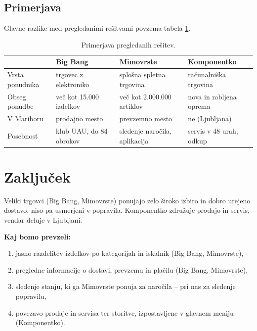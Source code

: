 \documentclass[11pt,a4paper]{article}
\begin{document}
\subsection{Primerjava}

Glavne razlike med pregledanimi rešitvami povzema tabela \ref{tabela1}.

\begin{table}[h]
\centering
\begin{tabular}{|l|>{\raggedright\arraybackslash}p{3.5cm}|>{\raggedright\arraybackslash}p{3.5cm}|>{\raggedright\arraybackslash}p{3.5cm}|}
\hline
 & \textbf{Big Bang} & \textbf{Mimovrste} & \textbf{Komponentko} \\
\hline
Vrsta ponudnika & trgovec z elektroniko & splošna spletna trgovina & računalniška trgovina \\
\hline
Obseg ponudbe & več kot 15.000 izdelkov & več kot 2.000.000 artiklov & nova in rabljena oprema \\
\hline
V Mariboru & prodajno mesto & prevzemno mesto & ne (Ljubljana) \\
\hline
Posebnost & klub UAU, do 84 obrokov & sledenje naročila, aplikacija & servis v 48 urah, odkup \\
\hline
\end{tabular}
\caption{Primerjava pregledanih rešitev.}
\label{tabela1}
\end{table}

\section{Zaključek}
\label{zakljucek}

Veliki trgovci (Big Bang, Mimovrste) ponujajo zelo široko izbiro in dobro urejeno
dostavo, niso pa usmerjeni v popravila. Komponentko združuje prodajo in servis,
vendar deluje v Ljubljani.

\textbf{Kaj bomo prevzeli:}
\begin{enumerate}
\item jasno razdelitev izdelkov po kategorijah in iskalnik (Big Bang, Mimovrste),
\item pregledne informacije o dostavi, prevzemu in plačilu (Big Bang, Mimovrste),
\item sledenje stanju, ki ga Mimovrste ponuja za naročila -- pri nas za sledenje popravilu,
\item povezavo prodaje in servisa ter storitve, izpostavljene v glavnem meniju (Komponentko).
\end{enumerate}
\end{document}
